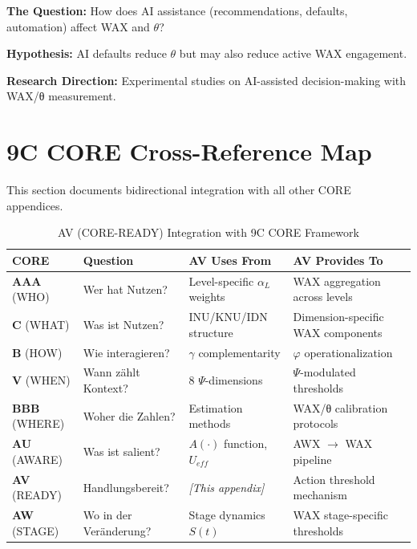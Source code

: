 \textbf{The Question:} How does AI assistance (recommendations, defaults, automation) affect WAX and $\theta$?

\textbf{Hypothesis:} AI defaults reduce $\theta$ but may also reduce active WAX engagement.

\textbf{Research Direction:} Experimental studies on AI-assisted decision-making with WAX/θ measurement.


\section{9C CORE Cross-Reference Map}
\label{sec:av-cross-reference-map}

This section documents bidirectional integration with all other CORE appendices.

\begin{table}[htbp]
\centering
\caption{AV (CORE-READY) Integration with 9C CORE Framework}
\label{tab:av-8c-integration}
\renewcommand{\arraystretch}{1.4}
\begin{tabular}{@{}p{2cm}p{3cm}p{4cm}p{4cm}@{}}
\toprule
\textbf{CORE} & \textbf{Question} & \textbf{AV Uses From} & \textbf{AV Provides To} \\
\midrule
\textbf{AAA} (WHO) & Wer hat Nutzen? & Level-specific $\alpha_L$ weights & WAX aggregation across levels \\
\textbf{C} (WHAT) & Was ist Nutzen? & INU/KNU/IDN structure & Dimension-specific WAX components \\
\textbf{B} (HOW) & Wie interagieren? & $\gamma$ complementarity & $\varphi$ operationalization \\
\textbf{V} (WHEN) & Wann zählt Kontext? & 8 $\Psi$-dimensions & $\Psi$-modulated thresholds \\
\textbf{BBB} (WHERE) & Woher die Zahlen? & Estimation methods & WAX/θ calibration protocols \\
\textbf{AU} (AWARE) & Was ist salient? & $A(\cdot)$ function, $U_{eff}$ & AWX $\to$ WAX pipeline \\
\textbf{AV} (READY) & Handlungsbereit? & \textit{[This appendix]} & Action threshold mechanism \\
\textbf{AW} (STAGE) & Wo in der Veränderung? & Stage dynamics $S(t)$ & WAX stage-specific thresholds \\
\bottomrule
\end{tabular}
\end{table}


